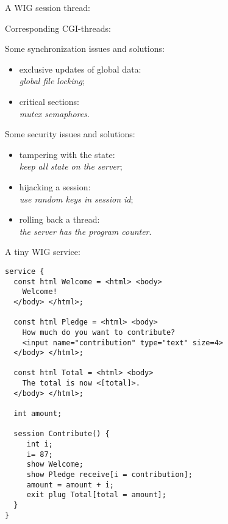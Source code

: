 \begin{slide*}
A WIG session thread:\\

\begin{center}
\end{center}

\vfil
\end{slide*}

\begin{slide*}
Corresponding CGI-threads:\\

\begin{center}
\end{center}

\vfil
\end{slide*}
 
\begin{slide*}
Some synchronization issues and solutions:
\begin{itemize}
\item exclusive updates of global data:\\
      {\em global file locking};
\item critical sections:\\
      {\em mutex semaphores}.
\end{itemize}
\vspace*{2ex}

Some security issues and solutions:
\begin{itemize}
\item tampering with the state: \\
      {\em keep all state on the server};
\item hijacking a session:\\
      {\em use random keys in session id};
\item rolling back a thread: \\
      {\em the server has the program counter}.
\end{itemize}
\vfil
\end{slide*}
 
\begin{slide*}
A tiny WIG service:

\begin{scriptsize}
\begin{verbatim}
service {
  const html Welcome = <html> <body>
    Welcome!
  </body> </html>;

  const html Pledge = <html> <body>
    How much do you want to contribute?
    <input name="contribution" type="text" size=4>
  </body> </html>;

  const html Total = <html> <body>
    The total is now <[total]>.
  </body> </html>;

  int amount;

  session Contribute() {
     int i;
     i= 87;
     show Welcome;
     show Pledge receive[i = contribution];
     amount = amount + i;
     exit plug Total[total = amount];
  }
}
\end{verbatim}
\end{scriptsize}
\vfil
\end{slide*}
 
